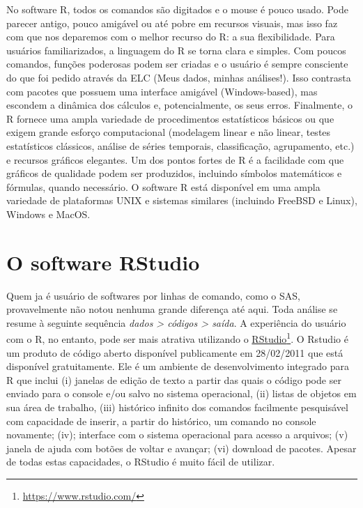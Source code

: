 \documentclass[
]{book}
\begin{document}
No software R, todos os comandos são digitados e o mouse é pouco usado. Pode parecer antigo, pouco amigável ou até pobre em recursos visuais, mas isso faz com que nos deparemos com o melhor recurso do R: a sua flexibilidade. Para usuários familiarizados, a linguagem do R se torna clara e simples. Com poucos comandos, funções poderosas podem ser criadas e o usuário é sempre consciente do que foi pedido através da ELC (Meus dados, minhas análises!). Isso contrasta com pacotes que possuem uma interface amigável (Windows-based), mas escondem a dinâmica dos cálculos e, potencialmente, os seus erros. Finalmente, o R fornece uma ampla variedade de procedimentos estatísticos básicos ou que exigem grande esforço computacional (modelagem linear e não linear, testes estatísticos clássicos, análise de séries temporais, classificação, agrupamento, etc.) e recursos gráficos elegantes. Um dos pontos fortes de R é a facilidade com que gráficos de qualidade podem ser produzidos, incluindo símbolos matemáticos e fórmulas, quando necessário. O software R está disponível em uma ampla variedade de plataformas UNIX e sistemas similares (incluindo FreeBSD e Linux), Windows e MacOS.

\hypertarget{o-software-rstudio}{%
\section{O software RStudio}\label{o-software-rstudio}}

Quem ja é usuário de softwares por linhas de comando, como o SAS, provavelmente não notou nenhuma grande diferença até aqui. Toda análise se resume à seguinte sequência \emph{dados \textgreater{} códigos \textgreater{} saída}. A experiência do usuário com o R, no entanto, pode ser mais atrativa utilizando o \href{https://www.rstudio.com/}{RStudio}\footnote{\url{https://www.rstudio.com/}}. O Rstudio é um produto de código aberto disponível publicamente em 28/02/2011 que está disponível gratuitamente. Ele é um ambiente de desenvolvimento integrado para R que inclui (i) janelas de edição de texto a partir das quais o código pode ser enviado para o console e/ou salvo no sistema operacional, (ii) listas de objetos em sua área de trabalho, (iii) histórico infinito dos comandos facilmente pesquisável com capacidade de inserir, a partir do histórico, um comando no console novamente; (iv); interface com o sistema operacional para acesso a arquivos; (v) janela de ajuda com botões de voltar e avançar; (vi) download de pacotes. Apesar de todas estas capacidades, o RStudio é muito fácil de utilizar.
\end{document}
